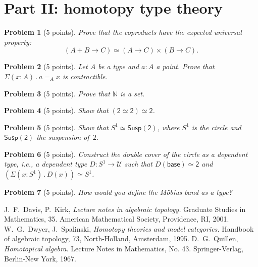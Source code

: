 \documentclass[12pt]{article}
\newcommand{\booktitle}[1]{\textit{#1}}
\newcommand{\dsum}[1]{\Sigma (#1) \,.\,}
\newcommand{\univ}{\mathcal{U}}
\newcommand{\susp}[1]{\mathsf{Susp}(#1)}
\newcommand{\two}{\mathsf{2}}
\newcommand{\eqv}{\simeq}
\newtheorem{problem}{Problem}}
\begin{document}
\section*{Part II: homotopy type theory}

\begin{problem}[5 points]
  Prove that the coproducts have the expected universal property:
  \begin{equation*}
    (A + B \to C) \eqv (A \to C) \times (B \to C).
  \end{equation*}
\end{problem}

\begin{problem}[5 points]
  Let $A$ be a type and $a : A$ a point. Prove that $\dsum{x : A} a =_A x$ is
  contractible.
\end{problem}

\begin{problem}[5 points]
  Prove that $\mathbb{N}$ is a set.
\end{problem}

\begin{problem}[5 points]
  Show that $(\two \eqv \two) \eqv \two$.
\end{problem}

\begin{problem}[5 points]
  Show that $S^1 \eqv \susp{\two}$, where $S^1$ is the circle and $\susp{\two}$ the
  suspension of~$\two$.
\end{problem}

\begin{problem}[5 points]
  Construct the \emph{double cover} of the circle as a dependent type, i.e.,
  a dependent type $D : S^1 \to \univ$ such that $D(\mathsf{base}) \eqv \two$ and
  $(\dsum{x : S^1} D(x)) \eqv S^1$.
\end{problem}

\begin{problem}[5 points]
  How would you define the \emph{Möbius band} as a type?
\end{problem}

\begin{thebibliography}{00}
                   J.~F.~Davis, P.~Kirk, \booktitle{Lecture notes in algebraic topology.} Graduate Studies in Mathematics, 35. American Mathematical Society, Providence, RI, 2001.
                   W.~G.~Dwyer, J.~Spalinski, \booktitle{Homotopy theories and model categories.} Handbook of algebraic topology, 73,
                                North-Holland, Amsterdam, 1995.
               D.~G.~Quillen, \booktitle{Homotopical algebra.} Lecture Notes in Mathematics, No. 43. Springer-Verlag, Berlin-New York, 1967.
\end{thebibliography}
\end{document}
